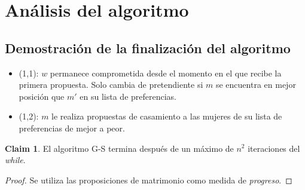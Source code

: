 \documentclass[12pt, fleqn]{article}
\theoremstyle{remark}
\theoremstyle{definition}
\newtheorem*{definition}{Claim}
\begin{document}
\section{Análisis del algoritmo}
\subsection{Demostración de la finalización del algoritmo}
\begin{itemize}
    \item (1,1): $w$ permanece comprometida desde el momento en el que recibe la primera
            propuesta. Solo cambia de pretendiente si $m$ se encuentra en mejor 
            posición que $m'$ en su lista de preferencias.
    \item (1,2): $m$ le realiza propuestas de casamiento a las mujeres de su 
            lista de preferencias de mejor a peor. 
\end{itemize}
\begin{definition}
    El algoritmo G-S termina después de un máximo de $n^2$ iteraciones del \emph{while}.
\end{definition}
\begin{proof}
    Se utiliza las proposiciones de matrimonio como medida de \emph{progreso}.
\end{proof}
\end{document}
